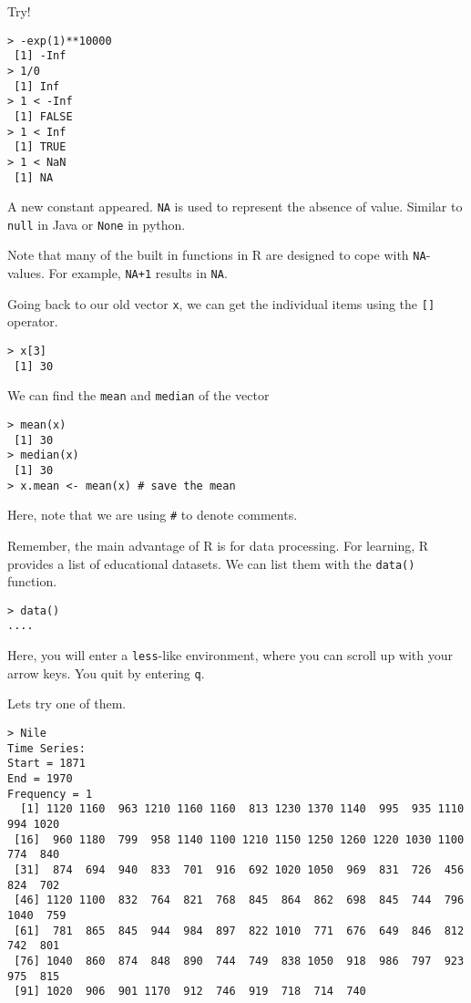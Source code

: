 \documentclass{article}[11pt]
\begin{document}
Try!

\begin{verbatim}
> -exp(1)**10000
 [1] -Inf
> 1/0
 [1] Inf
> 1 < -Inf
 [1] FALSE
> 1 < Inf
 [1] TRUE
> 1 < NaN
 [1] NA
\end{verbatim}

A new constant appeared. \texttt{NA} is used to represent the absence
of value. Similar to \texttt{null} in Java or \texttt{None} in python.

Note that many of the built in functions in R are designed to cope
with \texttt{NA}-values. For example, \texttt{NA+1} results in
\texttt{NA}.


Going back to our old vector \texttt{x}, we can get the individual
items using the \texttt{[]} operator.

\begin{verbatim}
> x[3]
 [1] 30
\end{verbatim}

We can find the \texttt{mean} and \texttt{median} of the vector

\begin{verbatim}
> mean(x)
 [1] 30
> median(x)
 [1] 30
> x.mean <- mean(x) # save the mean
\end{verbatim}

Here, note that we are using \texttt{\#} to denote comments.

Remember, the main advantage of R is for data processing. For
learning, R provides a list of educational datasets. We can list them
with the \texttt{data()} function.

\begin{verbatim}
> data()
....
\end{verbatim}

Here, you will enter a \texttt{less}-like environment, where you can
scroll up with your arrow keys. You quit by entering \texttt{q}.

Lets try one of them.

\begin{verbatim}
> Nile
Time Series:
Start = 1871 
End = 1970 
Frequency = 1 
  [1] 1120 1160  963 1210 1160 1160  813 1230 1370 1140  995  935 1110  994 1020
 [16]  960 1180  799  958 1140 1100 1210 1150 1250 1260 1220 1030 1100  774  840
 [31]  874  694  940  833  701  916  692 1020 1050  969  831  726  456  824  702
 [46] 1120 1100  832  764  821  768  845  864  862  698  845  744  796 1040  759
 [61]  781  865  845  944  984  897  822 1010  771  676  649  846  812  742  801
 [76] 1040  860  874  848  890  744  749  838 1050  918  986  797  923  975  815
 [91] 1020  906  901 1170  912  746  919  718  714  740
\end{verbatim}
\end{document}
